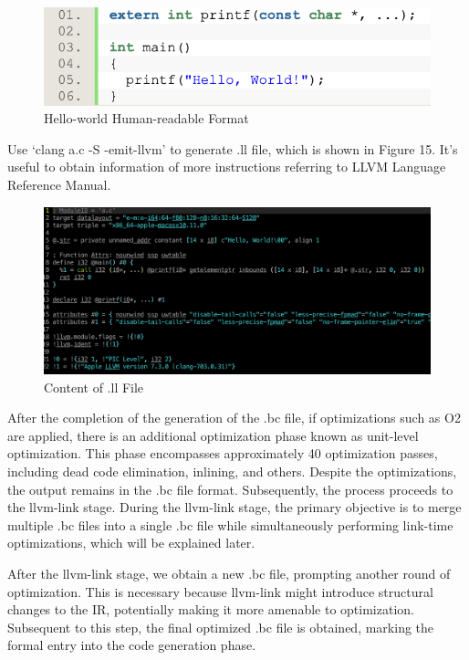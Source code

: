\documentclass[conference]{IEEEtran}
\begin{document}
\begin{figure}[htbp]
\centering
\includegraphics [width=0.95\linewidth]{pictures/helloworld.png}
\caption{Hello-world Human-readable Format}
\label{fig14}
\end{figure}

Use `clang a.c -S -emit-llvm' to generate .ll file, which is shown in Figure 15. It's useful to obtain information of more instructions referring to LLVM Language Reference Manual\cite{b11}.

\begin{figure}[htbp]
\centering
\includegraphics [width=0.95\linewidth]{pictures/llFile.png}
\caption{Content of .ll File\cite{b9}}
\label{fig15}
\end{figure}

After the completion of the generation of the .bc file, if optimizations such as O2 are applied, there is an additional optimization phase known as unit-level optimization. This phase encompasses approximately 40 optimization passes, including dead code elimination, inlining, and others. Despite the optimizations, the output remains in the .bc file format. Subsequently, the process proceeds to the llvm-link stage. During the llvm-link stage, the primary objective is to merge multiple .bc files into a single .bc file while simultaneously performing link-time optimizations, which will be explained later.

After the llvm-link stage, we obtain a new .bc file, prompting another round of optimization. This is necessary because llvm-link might introduce structural changes to the IR, potentially making it more amenable to optimization. Subsequent to this step, the final optimized .bc file is obtained, marking the formal entry into the code generation phase.
\end{document}

